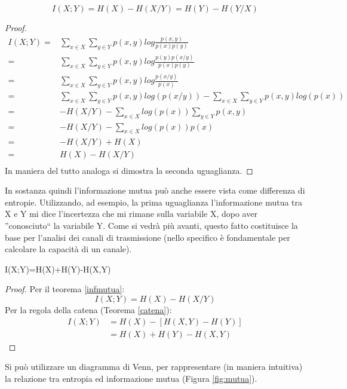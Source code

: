 \begin{teorema}
\[
 I(X;Y)=H(X)-H(X/Y)=H(Y)-H(Y/X)
\]
\begin{proof}
\[\begin{split}
 I(X;Y)=&\sum_{x \in X} \sum_{y \in Y} p(x,y) log \frac{p(x,y)}{p(x)p(y)} \\
   =&\sum_{x \in X} \sum_{y \in Y} p(x,y) log \frac{p(y)p(x/y)}{p(x)p(y)} \\
   =&\sum_{x \in X} \sum_{y \in Y} p(x,y) log \frac{p(x/y)}{p(x)} \\
   =&\sum_{x \in X} \sum_{y \in Y} p(x,y) log (p(x/y))-\sum_{x \in X} \sum_{y \in Y} p(x,y) log (p(x)) \\
   =&-H(X/Y)-\sum_{x \in X} log (p(x)) \sum_{y \in Y} p(x,y)\\
   =&-H(X/Y)-\sum_{x \in X} log (p(x)) p(x)\\
   =&-H(X/Y)+H(X)\\
   =&H(X)-H(X/Y)\\
 \end{split}
\]
In maniera del tutto analoga si dimostra la seconda uguaglianza.
\end{proof}
\label{infmutua}
\end{teorema}

In sostanza quindi l'informazione mutua può anche essere vista come differenza di entropie. Utilizzando, ad esempio, la prima 
uguaglianza l'informazione mutua tra X e Y mi dice l'incertezza che mi rimane sulla variabile X, dopo aver ''conosciuto`` la variabile 
Y. Come si vedrà più avanti, questo fatto costituisce la base per l'analisi dei canali di trasmissione (nello specifico è fondamentale 
per calcolare la capacità di un canale).

\begin{osservazione}
 I(X;Y)=H(X)+H(Y)-H(X,Y)
 \begin{proof}
  Per il teorema \ref{infmutua}:
  \[
  I(X;Y)=H(X)-H(X/Y)
  \]
  Per la regola della catena (Teorema \ref{catena}):
  \[\begin{split}
  I(X;Y)&=H(X)-[H(X,Y)-H(Y)] \\
        &=H(X)+H(Y)-H(X,Y)
    \end{split}
  \]
 \end{proof}
\end{osservazione}

Si può utilizzare un diagramma di Venn, per rappresentare (in maniera intuitiva) la relazione tra entropia ed informazione mutua (Figura \ref{fig:mutua}).

